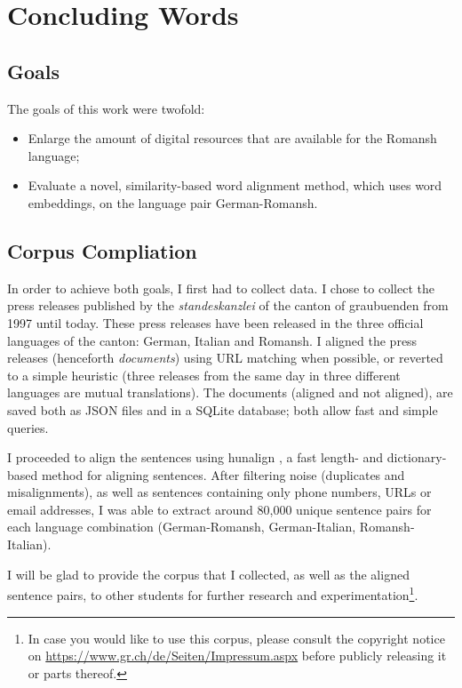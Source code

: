 \chapter{Concluding Words}\label{chap:summary}

\section{Goals}
The goals of this work were twofold: 
\begin{itemize}
	\item Enlarge the amount of digital resources that are available for the Romansh language;
	\item Evaluate a novel, similarity-based word alignment method, which uses word embeddings, on the language pair German-Romansh.
\end{itemize}


\section{Corpus Compliation}
In order to achieve both goals, I first had to collect data. 
I chose to collect the press releases published by the \emph{\Gls{standeskanzlei}} of the canton of \Gls{graubuenden} from 1997 until today. 
These press releases have been released in the three official languages of the canton: German, Italian and Romansh. 
I aligned the press releases (henceforth \emph{documents}) using URL matching when possible, or reverted to a simple heuristic (three releases from the same day in three different languages are mutual translations).
The documents (aligned and not aligned), are saved both as \acrshort{JSON} files and in a SQLite database; both allow  fast and simple queries.

I  proceeded to align the sentences using hunalign \autocite{hunalign}, a fast length- and dictionary-based method for aligning sentences. 
After filtering noise (duplicates and misalignments), as well as sentences containing only phone numbers, \acrshort{URL}s or email addresses, I was able to extract around 80,000 unique sentence pairs for each language combination (German-Romansh, German-Italian, Romansh-Italian).

I will be glad to provide  the corpus that I collected, as well as the aligned sentence pairs, to other students for further research and experimentation{\footnote{In case you would like to use this corpus, please consult the copyright notice on \url{https://www.gr.ch/de/Seiten/Impressum.aspx} before publicly releasing it or parts thereof.}}. 


